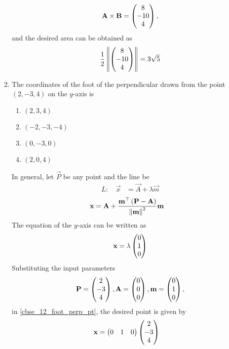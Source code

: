 \documentclass[journal,12pt,twocolumn]{IEEEtran}
\renewcommand\thesection{\arabic{section}}
\begin{document}
\begin{enumerate}[label=\thesection.\arabic*.,ref=\thesection.\theenumi]
\begin{align}
		\end{align}
		\begin{align}
			\mathbf{A}  \times 
			\mathbf{B}  = \begin{pmatrix}8 \\ -10 \\ 4\end{pmatrix},
		\end{align}
		and the  desired area can be obtained as 
		\begin{align}
			\frac{1}{2}\left\lVert\begin{pmatrix}8 \\ -10 \\ 4\end{pmatrix}\right\rVert = 3 \sqrt{5}
		\end{align}
\item  The coordinates of the foot of the perpendicular drawn from the point $ \left(2,-3,4 \right) $ on the $y$-axis is 

\begin{enumerate}
    \item $\left(2,3,4\right)$
    \item $\left(-2,-3,-4\right)$
    \item $\left(0,-3,0\right)$
    \item $\left(2,0,4\right)$
\end{enumerate}
\solution 
In general, let $\vec{P}$ be any point and the line be
\begin{align}
	\label{cbse_12_foot_perp_line}
	L: \quad	\vec{x} &=  \vec{A} + \lambda \vec{m}
		\end{align}
\begin{align}
	\label{cbse_12_foot_perp_pt}
\mathbf{x} &=  \mathbf{A} + \frac{	\mathbf{m}^{\top}\left(\mathbf{P}  -  \mathbf{A}\right)}{\left\lVert\mathbf{m}\right\rVert^2}\mathbf{m}
		\end{align}
The equation of the $y$-axis can be written as	
		\begin{align}
			\mathbf{x} = \lambda 	\begin{pmatrix}0 \\ 1 \\ 0\end{pmatrix} 
		\end{align}
		Substituting the input parameters 
		\begin{align}
			\mathbf{P} =  	\begin{pmatrix}2 \\ -3 \\ 4\end{pmatrix},  
			\mathbf{A} =  	\begin{pmatrix}0 \\ 0 \\ 0\end{pmatrix},  
			\mathbf{m} =  	\begin{pmatrix}0 \\ 1 \\ 0\end{pmatrix},  
		\end{align}
	in \eqref{cbse_12_foot_perp_pt},
  the desired point is given by 
\begin{align}
	\vec{x} &=   \myvec{0 & 1 & 0}\myvec{2 \\-3 \\4 } 

\end{align}
\end{enumerate}
\end{document}
